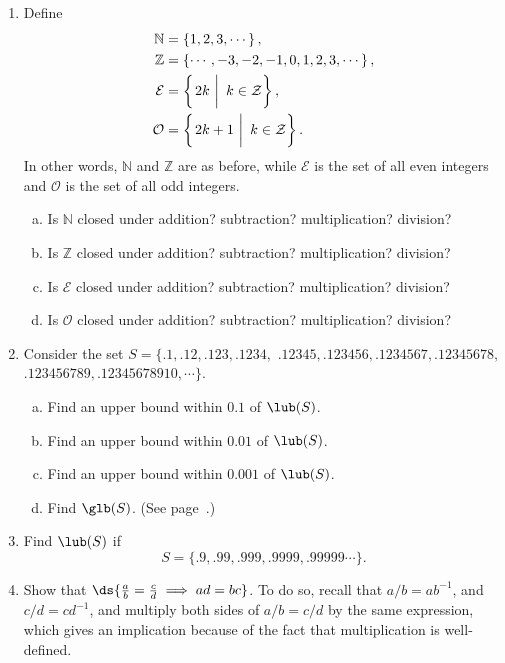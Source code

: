 \begin{multicols}{2}
\begin{enumerate}
\item Define 
\begin{align*}
\mathbb{N}&=\left\{1,2,3,\cdots\right\},\\
\mathbb{Z}&=\left\{\cdots,-3,-2,-1,0,1,2,3,\cdots\right\},\\
\mathcal{E}&=\left\{\left.\vphantom{\frac11}2k\ \right|\ k\in\mathcal{Z}
             \right\},\\
\mathcal{O}&=\left\{\left.\vphantom{\frac11}2k+1\ \right|\ k\in\mathcal{Z}
             \right\}.\end{align*}
In other words, $\mathbb{N}$ and $\mathbb{Z}$ are as before, while
                $\mathcal{E}$ is the set of all even integers and
                $\mathcal{O}$ is the set of all odd integers.
\begin{enumerate}[(a)]
  \item Is $\mathbb{N}$ closed under addition? subtraction? multiplication?
                      division?
  \item Is $\mathbb{Z}$ closed under addition? subtraction? multiplication?
                      division?
  \item Is $\mathcal{E}$ closed under addition? subtraction? multiplication?
                      division?
  \item Is $\mathcal{O}$ closed under addition? subtraction? multiplication?
                      division?
\end{enumerate}    
\item Consider the set $S=\{.1, .12, .123, .1234,$ $ .12345, 
                .123456, .1234567, .12345678,$ $ .123456789,
                .12345678910, \cdots\}$.
\begin{enumerate}[(a)]
  \item Find an upper bound within $0.1$ of $\lub (S)$.
  \item Find an upper bound within $0.01$ of $\lub (S)$.
  \item Find an upper bound within $0.001$ of $\lub (S)$.
  \item Find $\glb (S)$.  (See page~\pageref{GLBPage}.)
\end{enumerate}
\item Find $\lub(S)$ if 
$$S=\{.9, .99, .999, .9999, .99999\cdots\}.$$


\item Show that $\ds{\frac{a}b=\frac{c}d\implies ad=bc}$.
To do so, recall that $a/b=ab^{-1}$, and $c/d=cd^{-1}$, and
multiply both sides of $a/b=c/d$ by the same expression,
which gives an implication because of the fact that multiplication
is well-defined.


\end{enumerate}








\end{multicols}
\vfill\eject



